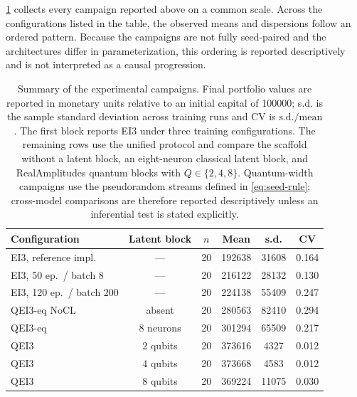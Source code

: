 \documentclass[aps,floatfix,superscriptaddress,twocolumn,tightenlines,amsmath,amssymb,nofootinbib,10pt,longbibliography,prl]{revtex4-2}
\begin{document}
\ref{tab:summary} collects every campaign reported above on a common scale. Across the configurations listed in the table, the observed means and dispersions follow an ordered pattern. Because the campaigns are not fully seed-paired and the architectures differ in parameterization, this ordering is reported descriptively and is not interpreted as a causal progression.
\begin{table}[htbp]
  \centering
  \caption{Summary of the experimental campaigns. Final portfolio values are reported in monetary units relative to an initial capital of \num{100000}; s.d. is the sample standard deviation across training runs and CV is $\mathrm{s.d.}/\mathrm{mean}$. The first block reports EI3 under three training configurations. The remaining rows use the unified protocol and compare the scaffold without a latent block, an eight-neuron classical latent block, and RealAmplitudes quantum blocks with $Q\in\{2,4,8\}$. Quantum-width campaigns use the pseudorandom streams defined in \ref{eq:seed-rule}; cross-model comparisons are therefore reported descriptively unless an inferential test is stated explicitly.}
  \label{tab:summary}
  \begin{tabular}{lccccc}
    \toprule
    Configuration & Latent block & $n$ & Mean & s.d. & CV \\
    \midrule
    EI3, reference impl.      & ---        & 20 & \num{192638} & \num{31608} & 0.164 \\
    EI3, 50 ep.\ / batch 8    & ---        & 20 & \num{216122} & \num{28132} & 0.130 \\
    EI3, 120 ep.\ / batch 200 & ---        & 20 & \num{224138} & \num{55409} & 0.247 \\
    \midrule
    QEI3-eq NoCL              & absent     & 20 & \num{280563} & \num{82410} & 0.294 \\
    QEI3-eq                   & 8 neurons  & 20 & \num{301294} & \num{65509} & 0.217 \\
    \midrule
    QEI3                      & 2 qubits   & 20 & \num{373616} & \num{4327}  & 0.012 \\
    QEI3                      & 4 qubits   & 20 & \num{373668} & \num{4583}  & 0.012 \\
    QEI3                      & 8 qubits   & 20 & \num{369224} & \num{11075} & 0.030 \\
    \bottomrule
  \end{tabular}
\end{table}
\end{document}
